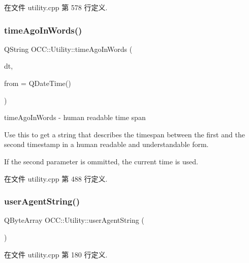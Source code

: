 在文件 utility.\+cpp 第 578 行定义.

\mbox{\label{namespace_o_c_c_1_1_utility_a10bd34d4993a7d659c3cafdc9144cbdd}} 
\subsubsection{\texorpdfstring{time\+Ago\+In\+Words()}{timeAgoInWords()}}
{\footnotesize\ttfamily Q\+String O\+C\+C\+::\+Utility\+::time\+Ago\+In\+Words (\begin{DoxyParamCaption}\item[{const Q\+Date\+Time \&}]{dt,  }\item[{const Q\+Date\+Time \&}]{from = {\ttfamily QDateTime()} }\end{DoxyParamCaption})}



time\+Ago\+In\+Words -\/ human readable time span 

Use this to get a string that describes the timespan between the first and the second timestamp in a human readable and understandable form.

If the second parameter is ommitted, the current time is used. 

在文件 utility.\+cpp 第 488 行定义.

\mbox{\label{namespace_o_c_c_1_1_utility_a4beaff7073bfbd75da5f761b8c02c1ab}} 
\subsubsection{\texorpdfstring{user\+Agent\+String()}{userAgentString()}}
{\footnotesize\ttfamily Q\+Byte\+Array O\+C\+C\+::\+Utility\+::user\+Agent\+String (\begin{DoxyParamCaption}{ }\end{DoxyParamCaption})}



在文件 utility.\+cpp 第 180 行定义.

\mbox{\label{namespace_o_c_c_1_1_utility_ac9cc640e21cdc30773dcdf9eaa01904d}} 
